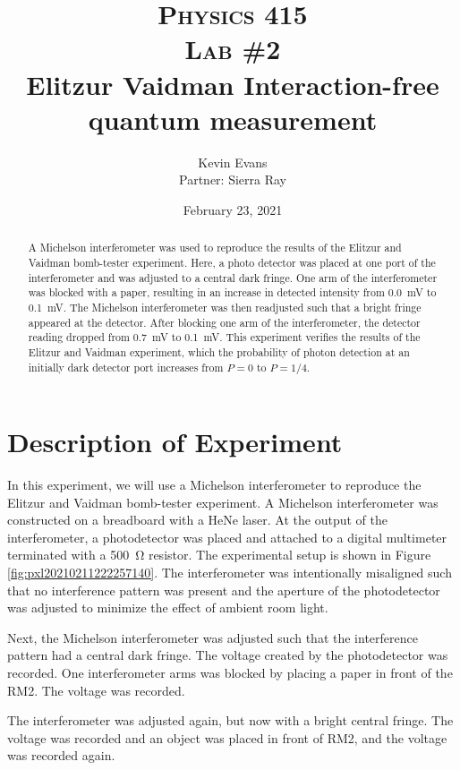 \documentclass[notitlepage]{report}
\title{
	\textsc{ \small
		Physics 415
	} \\
	{\textsc{\small Lab \#2}} \\
	Elitzur Vaidman Interaction-free quantum measurement
}
\author{Kevin Evans \\ Partner: Sierra Ray}
\date{February 23, 2021}
\begin{document}
	\begin{titlingpage}
		\maketitle
		\begin{abstract}
			\noindent A Michelson interferometer was used to reproduce the results of the Elitzur and Vaidman bomb-tester experiment. Here, a photo detector was placed at one port of the interferometer and was adjusted to a central dark fringe. One arm of the interferometer was blocked with a paper, resulting in an increase in detected intensity from \SI{0.0}{\mV} to \SI{0.1}{\mV}. 
			The Michelson interferometer was then readjusted such that a bright fringe appeared at the detector. After blocking one arm of the interferometer, the detector reading dropped from \SI{0.7}{\mV} to \SI{0.1}{\mV}.
			This experiment verifies the results of the Elitzur and Vaidman experiment, which the probability of photon detection at an initially dark detector port increases from $P=0$ to $P=1/4$.
		\end{abstract}
	\end{titlingpage}

	\section{Description of Experiment}
	In this experiment, we will use a Michelson interferometer to reproduce the Elitzur and Vaidman bomb-tester experiment. A Michelson interferometer was constructed on a breadboard with a HeNe laser. At the output of the interferometer, a photodetector was placed and attached to a digital multimeter terminated with a \SI{500}{\ohm} resistor. The experimental setup is shown in Figure \ref{fig:pxl20210211222257140}. The interferometer was intentionally misaligned such that no interference pattern was present and the aperture of the photodetector was adjusted to minimize the effect of ambient room light.
	
	
	Next, the Michelson interferometer was adjusted such that the interference pattern had a central dark fringe. The voltage created by the photodetector was recorded. One interferometer arms was blocked by placing a paper in front of the RM2. The voltage was recorded.
	
	The interferometer was adjusted again, but now with a bright central fringe. The voltage was recorded and an object was placed in front of RM2, and the voltage was recorded again.
	
\end{document}
